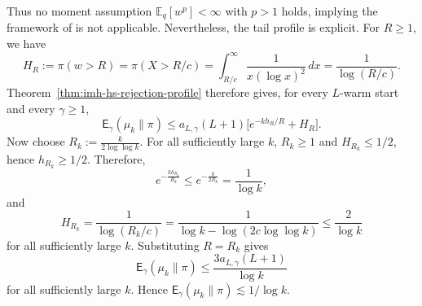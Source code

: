 \documentclass[10pt, journal]{IEEEtran}
\begin{document}
Thus no moment assumption $\mathbb E_q[w^p]<\infty$ with $p>1$ holds, implying the framework of \cite{deligiannidis2024importance} is not applicable. Nevertheless, the tail profile is explicit.  For $R\ge 1$, we have 
$$H_R:=\pi(w>R)=\pi(X>R/c)=\int_{R/c}^\infty\frac{1}{x(\log x)^2}\,dx=\frac{1}{\log(R/c)}.$$
Theorem~\ref{thm:imh-hs-rejection-profile} therefore gives, for every $L$-warm start and every $\gamma\ge1$,
$$\mathsf E_\gamma(\mu_k\|\pi)\le a_{L,\gamma}(L+1)\Big[e^{-kh_R/R}+H_R\Big].$$
Now choose $R_k:=\frac{k}{2\log\log k}.$ For all sufficiently large $k$, $R_k\ge 1$ and $H_{R_k}\le1/2$, hence $h_{R_k}\ge1/2$. Therefore,
$$e^{-\frac{kh_{R_k}}{R_k}}\le e^{-\frac{k}{2R_k}}=\frac1{\log k},$$
and
$$H_{R_k}=\frac{1}{\log(R_k/c)}=\frac{1}{\log k-\log(2c\log\log k)}\le \frac2{\log k}$$
for all sufficiently large $k$. Substituting $R=R_k$ gives
$$\mathsf E_\gamma(\mu_k\|\pi)\le \frac{3a_{L,\gamma}(L+1)}{\log k}$$
for all sufficiently large $k$. Hence $\mathsf E_\gamma(\mu_k\|\pi)\lesssim 1/\log k.$
\end{document}
